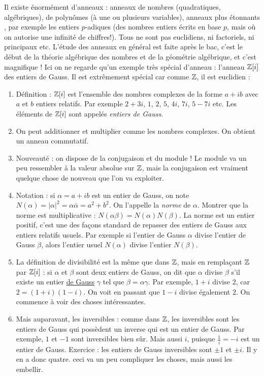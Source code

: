 Il existe énormément d'anneaux : anneaux de nombres (quadratiques, algébriques), de polynômes (à une ou plusieurs variables), anneaux plus étonnants , par exemple les entiers $p$-adiques (des nombres entiers écrits en base $p$, mais où on autorise une infinité de chiffres!). Tous ne sont pas euclidiens, ni factoriels, ni principaux etc. L'étude des anneaux en général est faite après le bac, c'est le début de la théorie algébrique des nombres et de la géométrie algébrique, et c'est magnifique ! Ici on ne regarde qu'un exemple très spécial d'anneau : l'anneau $\mathbb Z[i]$ des entiers de Gauss. Il est extrêmement spécial car comme $\mathbb Z$, il est euclidien :
\begin{enumerate}
\item Définition : $\mathbb Z[i]$ est l'ensemble des nombres complexes de la forme $a+ib$ avec $a$ et $b$ entiers relatifs. Par exemple $2+3i$, $1$, $2$, $5$, $4i$, $7i$, $5-7i$ etc. Les éléments de $\mathbb Z[i]$ sont appelés \emph{entiers de Gauss}.
\item On peut additionner et multiplier comme les nombres complexes. On obtient un anneau commutatif.
\item Nouveauté : on dispose de la conjugaison et du module ! Le module va un peu ressembler à la valeur absolue sur $\mathbb Z$, mais la conjugaison est vraiment quelque chose de nouveau que l'on va exploiter.
\item Notation : si $\alpha=a+ib$ est un entier de Gauss, on note $N(\alpha) = |\alpha|^2=\alpha\bar\alpha = a^2+b^2$. On l'appelle la \emph{norme} de $\alpha$. Montrer que la norme est multiplicative : $N(\alpha\beta) = N(\alpha)N(\beta)$. La norme est un entier positif, c'est une des façons standard de repasser des entiers de Gauss aux entiers relatifs usuels. Par exemple si l'entier de Gauss $\alpha$ divise l'entier de Gauss $\beta$, alors l'entier usuel $N(\alpha)$ divise l'entier $N(\beta)$.
\item La définition de divisibilité est la même que dans $\mathbb Z$, mais en remplaçant $\mathbb Z$ par $\mathbb Z[i]$ : si $\alpha$ et $\beta$ sont deux entiers de Gauss, on dit que $\alpha$ divise $\beta$ s'il existe un entier \underline{de Gauss} $\gamma$ tel que $\beta=\alpha\gamma$. Par exemple, $1+i$ divise $2$, car $2 = (1+i)(1-i)$. On voit en passant que $1-i$ divise également $2$. On commence à voir des choses intéressantes.
\item Mais auparavant, les inversibles : comme dans $\mathbb Z$, les inversibles sont les entiers de Gauss qui possèdent un inverse qui est un entier de Gauss. Par exemple, $1$ et $-1$ sont inversibles bien sûr. Mais aussi $i$, puisque $\frac{1}{i}=-i$ est un entier de Gauss. Exercice : les entiers de Gauss inversibles sont $\pm 1$ et $\pm i$. Il y en a donc quatre. ceci va un peu compliquer les choses, mais aussi les embellir. 

\end{enumerate}
